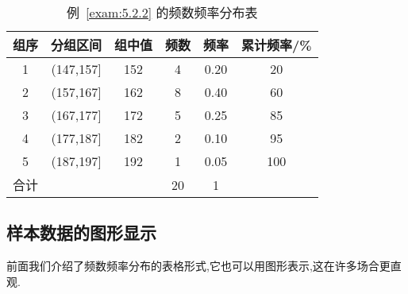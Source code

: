 \begin{table}[!htp]
  \centering
  \caption{例~\ref{exam:5.2.2} 的频数频率分布表}\label{table5.2.1}
\begin{tabularx}{0.7\textwidth}{cccccc}
\toprule
组序&分组区间&组中值&频数&频率&累计频率/\%\\
\midrule
1&(147,157]&152&4&0.20&20\\
2&(157,167]&162&8&0.40&60\\
3&(167,177]&172&5&0.25&85\\
4&(177,187]&182&2&0.10&95\\
5&(187,197]&192&1&0.05&100\\
合计&&&20&1&\\
\bottomrule
\end{tabularx}
\end{table}
\subsection{样本数据的图形显示\label{ssec:5.2.3}}
前面我们介绍了频数频率分布的表格形式,它也可以用图形表示,这在许多场合更直观.
